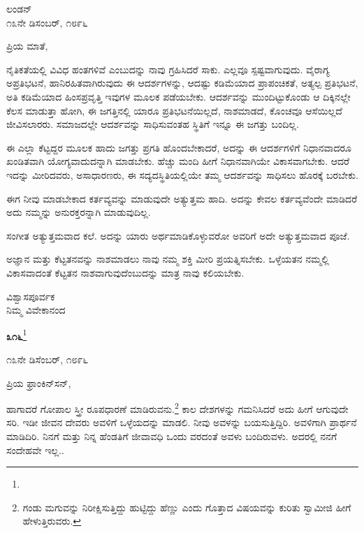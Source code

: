 \begin{flushright}
ಲಂಡನ್\\೧೩ನೇ ಡಿಸಂಬರ್, ೧೮೯೬
\end{flushright}

\noindent
ಪ್ರಿಯ ಮಾತೆ,

ನೈತಿಕತೆಯಲ್ಲಿ ವಿವಿಧ ಹಂತಗಳಿವೆ ಎಂಬುದನ್ನು ನಾವು ಗ್ರಹಿಸಿದರೆ ಸಾಕು. ಎಲ್ಲವೂ ಸ್ಪಷ್ಟವಾಗುವುದು. ವೈರಾಗ್ಯ\enginline{-} ಅಪ್ರತಿಭಟನೆ, ಹಾನಿರಹಿತವಾಗಿರುವುದು\enginline{-} ಈ ಆದರ್ಶಗಳನ್ನು, ಆದಷ್ಟು ಕಡಿಮೆಯಾದ ಪ್ರಾಪಂಚಿಕತೆ, ಅತ್ಯಲ್ಪ ಪ್ರತಿಭಟನೆ, ಅತಿ ಕಡಿಮೆಯಾದ ಹಿಂಸಪ್ರವೃತ್ತಿ\enginline{-} ಇವುಗಳ ಮೂಲಕ ಪಡೆಯಬೇಕು. ಆದರ್ಶವನ್ನು ಮುಂದಿಟ್ಟುಕೊಂಡು ಆ ದಿಕ್ಕಿನಲ್ಲೇ ಕೆಲಸ ಮಾಡುತ್ತಾ ಹೋಗಿ, ಈ ಜಗತ್ತಿನಲ್ಲಿ ಯಾರೂ ಪ್ರತಿಭಟನೆಯಿಲ್ಲದೆ, ನಾಶಮಾಡದೆ, ಕೊಂಚವೂ ಆಸೆಯಿಲ್ಲದೆ ಜೀವಿಸಲಾರರು. ಸಮಾಜದಲ್ಲೇ ಆದರ್ಶವನ್ನು ಸಾಧಿಸುವಂತಹ ಸ್ಥಿತಿಗೆ ಇನ್ನೂ ಈ ಜಗತ್ತು ಬಂದಿಲ್ಲ.

ಈ ಎಲ್ಲಾ ಕೆಟ್ಟದ್ದರ ಮೂಲಕ ಹಾದು ಜಗತ್ತು ಪ್ರಗತಿ ಹೊಂದಬೇಕಾದರೆ, ಅದನ್ನು ಈ ಆದರ್ಶಗಳಿಗೆ ನಿಧಾನವಾದರೂ ಖಂಡಿತವಾಗಿ ಯೋಗ್ಯವಾದುದನ್ನಾಗಿ ಮಾಡಬೇಕು. ಹೆಚ್ಚು ಮಂದಿ ಹೀಗೆ ನಿಧಾನವಾಗಿಯೇ ವಿಕಾಸವಾಗಬೇಕು. ಆದರೆ ಇದನ್ನು ಮೀರಿದವರು, ಅಸಾಧಾರಣರು, ಈ ಸದ್ಯದಸ್ಥಿತಿಯಲ್ಲಿಯೇ ತಮ್ಮ ಆದರ್ಶವನ್ನು ಸಾಧಿಸಲು ಹೊರಕ್ಕೆ ಬರಬೇಕು.

ಈಗ ನೀವು ಮಾಡಬೇಕಾದ ಕರ್ತವ್ಯವನ್ನು ಮಾಡುವುದೇ ಅತ್ಯುತ್ತಮ ಹಾದಿ. ಅದನ್ನು ಕೇವಲ ಕರ್ತವ್ಯವೆಂದೇ ಮಾಡಿದರೆ ಅದು ನಮ್ಮನ್ನು ಅನುರಕ್ತರನ್ನಾಗಿ ಮಾಡುವುದಿಲ್ಲ.

ಸಂಗೀತ ಅತ್ಯುತ್ತಮವಾದ ಕಲೆ. ಅದನ್ನು ಯಾರು ಅರ್ಥಮಾಡಿಕೊಳ್ಳುವರೋ ಅವರಿಗೆ ಅದೇ ಅತ್ಯುತ್ತಮವಾದ ಪೂಜೆ.

ಅಜ್ಞಾನ ಮತ್ತು ಕೆಟ್ಟತನವನ್ನು ನಾಶಮಾಡಲು ನಾವು ನಮ್ಮ ಶಕ್ತಿ ಮೀರಿ ಪ್ರಯತ್ನಿಸಬೇಕು. ಒಳ್ಳೆಯತನ ನಮ್ಮಲ್ಲಿ ವಿಕಾಸವಾದಂತೆ ಕೆಟ್ಟತನ ನಾಶವಾಗುವುದೆಂಬುದನ್ನು ಮಾತ್ರ ನಾವು ಕಲಿಯಬೇಕು.

\vspace{-0.25cm}

{\flushright
ವಿಶ್ವಾಸಪೂರ್ವಕ\\ನಿಮ್ಮ ವಿವೇಕಾನಂದ\par}

\begin{center}
\textbf{೩೧೬}\footnote{}
\end{center}

\vspace{-0.25cm}

\begin{flushright}
೧೩ನೇ ಡಿಸೆಂಬರ್, ೧೮೯೬
\end{flushright}

\vspace{-0.2cm}

\noindent
ಪ್ರಿಯ ಫ್ರಾಂಕಿನ್‌ಸನ್,

ಹಾಗಾದರೆ ಗೋಪಾಲ ಸ್ತ್ರೀ ರೂಪಧಾರಣೆ ಮಾಡಿರುವನು.\footnote{ಗಂಡು ಮಗುವನ್ನು ನಿರೀಕ್ಷಿಸುತ್ತಿದ್ದು ಹುಟ್ಟಿದ್ದು ಹೆಣ್ಣು ಎಂದು ಗೊತ್ತಾದ ವಿಷಯವನ್ನು ಕುರಿತು ಸ್ವಾಮೀಜಿ ಹೀಗೆ ಹೇಳುತ್ತಿರುವರು.} ಕಾಲ ದೇಶಗಳನ್ನು ಗಮನಿಸಿದರೆ ಅದು ಹೀಗೆ ಆಗುವುದೇ ಸರಿ. ಇಡೀ ಜೀವನ ದೇವರು ಅವಳಿಗೆ ಒಳ್ಳೆಯದನ್ನು ಮಾಡಲಿ. ನೀವು ಅವಳನ್ನು ಬಯಸುತ್ತಿದ್ದಿರಿ. ಅವಳಿಗಾಗಿ ಪ್ರಾರ್ಥನೆ ಮಾಡಿದಿರಿ. ನಿನಗೆ ಮತ್ತು ನಿನ್ನ ಹೆಂಡತಿಗೆ ಜೀವಾವಧಿ ಒಂದು ವರದಂತೆ ಅವಳು ಬಂದಿರುವಳು. ಅದರಲ್ಲಿ ನನಗೆ ಸಂದೇಹವೇ ಇಲ್ಲ..

